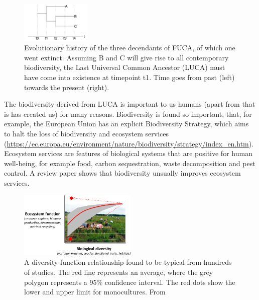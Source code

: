 \begin{figure}[H]
  \includegraphics[width=0.3\textwidth]{t_3.png}
  \caption{
    Evolutionary history of the three decendants of FUCA, 
    of which one went extinct.
    Assuming B and C will give rise to all contemporary biodiversity,
    the Last Universal Common Ancestor (LUCA) must have come into existence
    at timepoint t1.
    Time goes from past (left) towards the present (right).
  }
  \label{fig:t_3}
\end{figure}

The biodiversity derived from LUCA is important to us 
humans (apart from that is has created us) for many reasons.
Biodiversity is found so important, that, for example, 
the European Union has an explicit Biodiversity Strategy,
which aims to halt the loss of biodiversity and ecosystem 
services (\url{https://ec.europa.eu/environment/nature/biodiversity/strategy/index_en.htm}).
Ecosystem services are features of biological systems that are 
positive for human well-being, for example food,
carbon sequestration, waste decomposition and pest control.
A review paper \cite{cardinale2012biodiversity} shows that 
biodiversity unsually improves ecosystem services.

\begin{figure}[H]
  \includegraphics[width=0.5\textwidth]{cardinale_et_al_fig_1.png}
  \caption{
    A diversity-function relationship found to be typical from hundreds
    of studies. The red line represents an average, where the grey polygon
    represents a 95\% confidence interval. The red dots show the lower
    and upper limit for monocultures. From \cite{cardinale2012biodiversity}
  }
  \label{fig:cardinale_et_al}
\end{figure}

